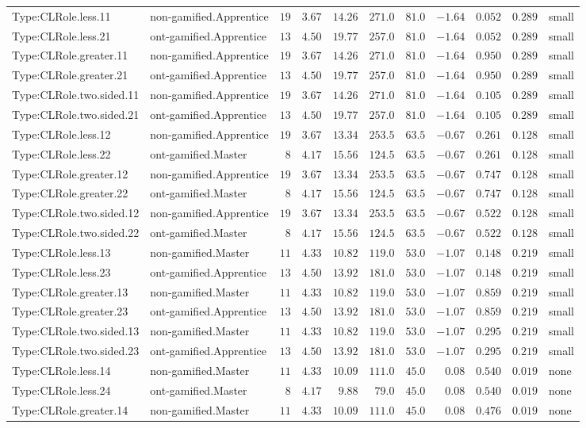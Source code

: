 \documentclass[6pt,a4paper]{article}
\begin{document}
{\begin{longtable}{llrrrrrrrrl}
Type:CLRole.less.11&non-gamified.Apprentice&$19$&$3.67$&$14.26$&$271.0$&$ 81.0$&$-1.64$&$0.052$&$0.289$&small\tabularnewline
Type:CLRole.less.21&ont-gamified.Apprentice&$13$&$4.50$&$19.77$&$257.0$&$ 81.0$&$-1.64$&$0.052$&$0.289$&small\tabularnewline
Type:CLRole.greater.11&non-gamified.Apprentice&$19$&$3.67$&$14.26$&$271.0$&$ 81.0$&$-1.64$&$0.950$&$0.289$&small\tabularnewline
Type:CLRole.greater.21&ont-gamified.Apprentice&$13$&$4.50$&$19.77$&$257.0$&$ 81.0$&$-1.64$&$0.950$&$0.289$&small\tabularnewline
Type:CLRole.two.sided.11&non-gamified.Apprentice&$19$&$3.67$&$14.26$&$271.0$&$ 81.0$&$-1.64$&$0.105$&$0.289$&small\tabularnewline
Type:CLRole.two.sided.21&ont-gamified.Apprentice&$13$&$4.50$&$19.77$&$257.0$&$ 81.0$&$-1.64$&$0.105$&$0.289$&small\tabularnewline
Type:CLRole.less.12&non-gamified.Apprentice&$19$&$3.67$&$13.34$&$253.5$&$ 63.5$&$-0.67$&$0.261$&$0.128$&small\tabularnewline
Type:CLRole.less.22&ont-gamified.Master&$ 8$&$4.17$&$15.56$&$124.5$&$ 63.5$&$-0.67$&$0.261$&$0.128$&small\tabularnewline
Type:CLRole.greater.12&non-gamified.Apprentice&$19$&$3.67$&$13.34$&$253.5$&$ 63.5$&$-0.67$&$0.747$&$0.128$&small\tabularnewline
Type:CLRole.greater.22&ont-gamified.Master&$ 8$&$4.17$&$15.56$&$124.5$&$ 63.5$&$-0.67$&$0.747$&$0.128$&small\tabularnewline
Type:CLRole.two.sided.12&non-gamified.Apprentice&$19$&$3.67$&$13.34$&$253.5$&$ 63.5$&$-0.67$&$0.522$&$0.128$&small\tabularnewline
Type:CLRole.two.sided.22&ont-gamified.Master&$ 8$&$4.17$&$15.56$&$124.5$&$ 63.5$&$-0.67$&$0.522$&$0.128$&small\tabularnewline
Type:CLRole.less.13&non-gamified.Master&$11$&$4.33$&$10.82$&$119.0$&$ 53.0$&$-1.07$&$0.148$&$0.219$&small\tabularnewline
Type:CLRole.less.23&ont-gamified.Apprentice&$13$&$4.50$&$13.92$&$181.0$&$ 53.0$&$-1.07$&$0.148$&$0.219$&small\tabularnewline
Type:CLRole.greater.13&non-gamified.Master&$11$&$4.33$&$10.82$&$119.0$&$ 53.0$&$-1.07$&$0.859$&$0.219$&small\tabularnewline
Type:CLRole.greater.23&ont-gamified.Apprentice&$13$&$4.50$&$13.92$&$181.0$&$ 53.0$&$-1.07$&$0.859$&$0.219$&small\tabularnewline
Type:CLRole.two.sided.13&non-gamified.Master&$11$&$4.33$&$10.82$&$119.0$&$ 53.0$&$-1.07$&$0.295$&$0.219$&small\tabularnewline
Type:CLRole.two.sided.23&ont-gamified.Apprentice&$13$&$4.50$&$13.92$&$181.0$&$ 53.0$&$-1.07$&$0.295$&$0.219$&small\tabularnewline
Type:CLRole.less.14&non-gamified.Master&$11$&$4.33$&$10.09$&$111.0$&$ 45.0$&$ 0.08$&$0.540$&$0.019$&none\tabularnewline
Type:CLRole.less.24&ont-gamified.Master&$ 8$&$4.17$&$ 9.88$&$ 79.0$&$ 45.0$&$ 0.08$&$0.540$&$0.019$&none\tabularnewline
Type:CLRole.greater.14&non-gamified.Master&$11$&$4.33$&$10.09$&$111.0$&$ 45.0$&$ 0.08$&$0.476$&$0.019$&none\tabularnewline

\end{longtable}}
\end{document}
